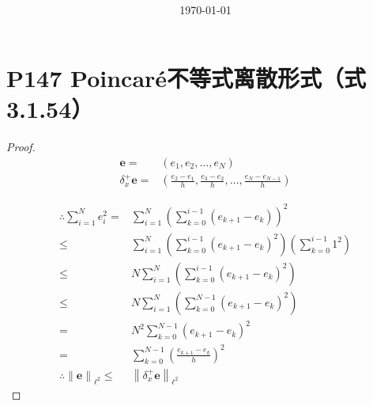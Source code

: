 \documentclass{article}%
\title{\heiti \myArticleName \\ [2ex] \begin{large} \myHomeworkNumber \end{large}}
\author{\kaishu \myName \myNumber}
\date{\today}
\begin{document}
\maketitle


\section{P147 Poincar\'{e}不等式离散形式（式3.1.54）}

\begin{proof}
\begin{align*}
	\mathbf{e}=&\left ( e_1,e_2,\dots ,e_N \right )\\
	\delta ^+_x \mathbf{e}=&\left ( \frac{e_2-e_1}{h},\frac{e_3-e_2}{h},\dots ,\frac{e_N-e_{N-1}}{h} \right )
\end{align*}

\begin{align*}
\therefore \sum_{i=1}^{N}e^2_i = & \sum_{i=1}^{N}\left (\sum_{k=0}^{i-1}\left (e_{k+1}-e_k  \right )  \right )^2 \\
\leq & \sum_{i=1}^{N}\left (\sum_{k=0}^{i-1}\left (e_{k+1}-e_k  \right )^2  \right ) \left (\sum_{k=0}^{i-1} 1^2  \right )  \\
\leq & N \sum_{i=1}^{N}\left (\sum_{k=0}^{i-1}\left (e_{k+1}-e_k  \right )^2  \right ) \\
\leq & N \sum_{i=1}^{N}\left (\sum_{k=0}^{N-1}\left (e_{k+1}-e_k  \right )^2  \right ) \\
= &  N^2 \sum_{k=0}^{N-1}\left (e_{k+1}-e_k  \right )^2   \\
= &   \sum_{k=0}^{N-1} \left ( \frac{e_{k+1}-e_k}{h} \right )^2  \\
\therefore \left \| \mathbf{e}  \right \|_{\ell^2} \leq & \left \| \delta ^+_x \mathbf{e}  \right \|_{\ell^2}
\end{align*}
\end{proof}
\end{document}
